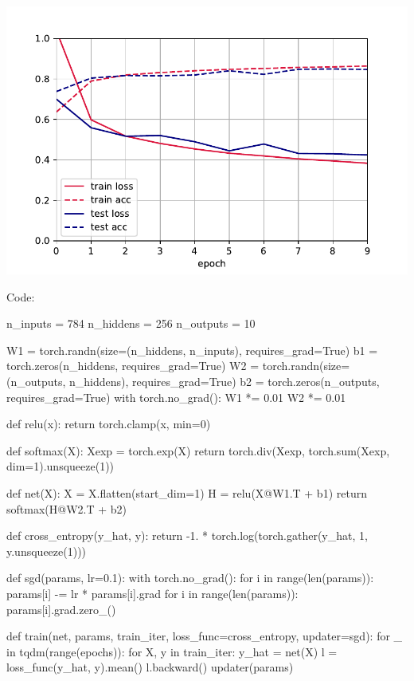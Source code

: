 \documentclass[submit]{harvardml}
\begin{document}
\includegraphics[width=\linewidth]{final_plot}

Code:

\begin{python}
n_inputs = 784
n_hiddens = 256
n_outputs = 10

W1 = torch.randn(size=(n_hiddens, n_inputs), requires_grad=True)
b1 = torch.zeros(n_hiddens, requires_grad=True)
W2 = torch.randn(size=(n_outputs, n_hiddens), requires_grad=True)
b2 = torch.zeros(n_outputs, requires_grad=True)
with torch.no_grad():
    W1 *= 0.01
    W2 *= 0.01



def relu(x):
    return torch.clamp(x, min=0)



def softmax(X):
    Xexp = torch.exp(X)
    return torch.div(Xexp, torch.sum(Xexp, dim=1).unsqueeze(1))



def net(X):
    X = X.flatten(start_dim=1)
    H = relu(X@W1.T + b1)
    return softmax(H@W2.T + b2)



def cross_entropy(y_hat, y):
    return -1. * torch.log(torch.gather(y_hat, 1, y.unsqueeze(1)))



def sgd(params, lr=0.1):
    with torch.no_grad():
        for i in range(len(params)):
            params[i] -= lr * params[i].grad
        for i in range(len(params)):
            params[i].grad.zero_()



def train(net, params, train_iter, loss_func=cross_entropy, updater=sgd):
    for _ in tqdm(range(epochs)):
        for X, y in train_iter:
            y_hat = net(X)
            l = loss_func(y_hat, y).mean()
            l.backward()
            updater(params)

\end{python}
\end{document}
